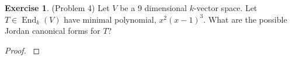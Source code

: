 \documentclass[12pt, psamsfonts]{amsart}
\theoremstyle{definition}
\newtheorem*{exer}{Exercise}
\theoremstyle{remark}
\DeclareMathOperator{\End}{End}
\numberwithin{equation}{section}
\begin{document}
\begin{exer}{(Problem 4)}
  Let $V$ be a 9 dimensional $k$-vector space.
  Let $T \in \End_k(V)$ have minimal polynomial, $x^2(x - 1)^3$.
  What are the possible Jordan canonical forms for $T$?
\end{exer}

\begin{proof}
  $ $
\end{proof}
\end{document}
